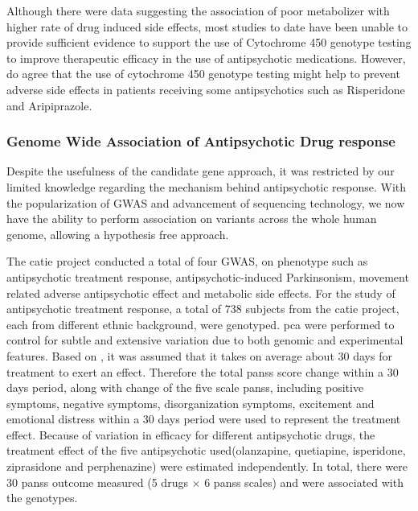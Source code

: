 	Although there were data suggesting the association of poor metabolizer with higher rate of drug induced side effects\citep{Ravyn2013}, most studies to date have been unable to provide sufficient evidence to support the use of Cytochrome 450 genotype testing to improve therapeutic
	efficacy in the use of antipsychotic medications\citep{Ravyn2013}.
	However, \citet{Ravyn2013} do agree that the use of cytochrome 450 genotype testing might help to prevent adverse side effects in patients receiving some antipsychotics such as Risperidone and Aripiprazole.
	
	\subsubsection{Genome Wide Association of Antipsychotic Drug response}
	Despite the usefulness of the candidate gene approach, it was restricted by our limited knowledge regarding the mechanism behind antipsychotic response.
	With the popularization of \gls{GWAS} and advancement of sequencing technology, we now have the ability to perform association on variants across the whole human genome, allowing a hypothesis free approach.
	
	The \gls{catie} project conducted a total of four \gls{GWAS}, on phenotype such as antipsychotic treatment response\citep{McClay2011}, antipsychotic-induced
	Parkinsonism\citep{Alkelai2009}, movement related adverse antipsychotic effect\citep{Aberg2010} and metabolic side effects\citep{Adkins2011}.
	For the study of antipsychotic treatment response\citep{McClay2011}, a total of 738 subjects from the \gls{catie} project, each from different ethnic background, were genotyped.
	\Gls{pca} were performed to control for subtle and extensive variation due to both genomic and experimental features.
	Based on \citet{VandenOord2009}, it was assumed that it takes on average about 30 days for treatment to exert an effect. 
	Therefore the total \gls{panss} score change within a 30 days period, along with change of the five scale \gls{panss}, including positive symptoms, negative symptoms, disorganization symptoms, excitement and emotional distress within a 30 days period were used to represent the treatment effect.
	Because of variation in efficacy for different antipsychotic drugs, the treatment effect of the five antipsychotic used(olanzapine, quetiapine, isperidone, ziprasidone and perphenazine) were estimated independently. 
	In total, there were 30 \gls{panss} outcome measured (5 drugs $\times$ 6 \gls{panss} scales) and were associated with the genotypes.
	
